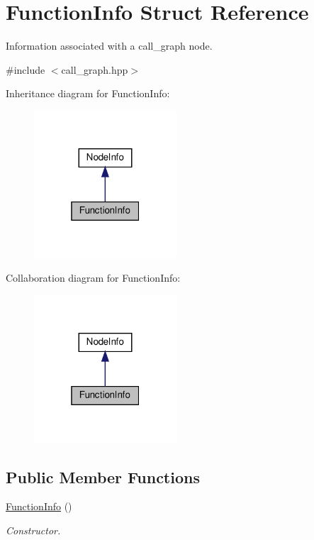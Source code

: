 \hypertarget{structFunctionInfo}{}\section{Function\+Info Struct Reference}
\label{structFunctionInfo}


Information associated with a call\+\_\+graph node.  




{\ttfamily \#include $<$call\+\_\+graph.\+hpp$>$}



Inheritance diagram for Function\+Info\+:
\nopagebreak
\begin{figure}[H]
\begin{center}
\leavevmode
\includegraphics[width=151pt]{df/d2b/structFunctionInfo__inherit__graph}
\end{center}
\end{figure}


Collaboration diagram for Function\+Info\+:
\nopagebreak
\begin{figure}[H]
\begin{center}
\leavevmode
\includegraphics[width=151pt]{de/dff/structFunctionInfo__coll__graph}
\end{center}
\end{figure}
\subsection*{Public Member Functions}
\begin{DoxyCompactItemize}
\item 
\hyperlink{structFunctionInfo_a94835d2fc06ddb449f84735069843170}{Function\+Info} ()
\begin{DoxyCompactList}\small\item\em Constructor. \end{DoxyCompactList}\end{DoxyCompactItemize}
